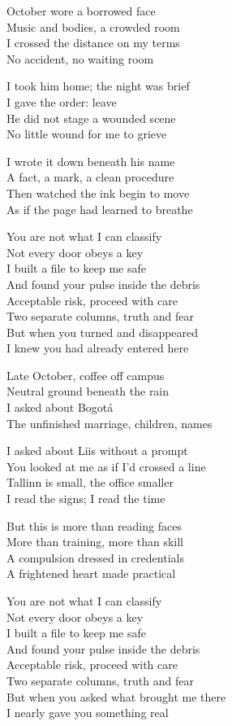 \begin{lyrics}
October wore a borrowed face\\
Music and bodies, a crowded room\\
I crossed the distance on my terms\\
No accident, no waiting room

I took him home; the night was brief\\
I gave the order: leave\\
He did not stage a wounded scene\\
No little wound for me to grieve

I wrote it down beneath his name\\
A fact, a mark, a clean procedure\\
Then watched the ink begin to move\\
As if the page had learned to breathe

You are not what I can classify\\
Not every door obeys a key\\
I built a file to keep me safe\\
And found your pulse inside the debris\\
Acceptable risk, proceed with care\\
Two separate columns, truth and fear\\
But when you turned and disappeared\\
I knew you had already entered here

Late October, coffee off campus\\
Neutral ground beneath the rain\\
I asked about Bogotá\\
The unfinished marriage, children, names

I asked about Liis without a prompt\\
You looked at me as if I’d crossed a line\\
Tallinn is small, the office smaller\\
I read the signs; I read the time

But this is more than reading faces\\
More than training, more than skill\\
A compulsion dressed in credentials\\
A frightened heart made practical

You are not what I can classify\\
Not every door obeys a key\\
I built a file to keep me safe\\
And found your pulse inside the debris\\
Acceptable risk, proceed with care\\
Two separate columns, truth and fear\\
But when you asked what brought me there\\
I nearly gave you something real


\end{lyrics}
